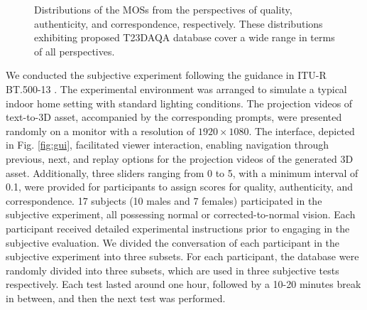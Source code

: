 \begin{figure*}[t]
    \centering
    \caption{Distributions of the MOSs from the perspectives of quality, authenticity, and correspondence, respectively. These distributions exhibiting proposed T23DAQA database cover a wide range in terms of all perspectives. }
    \label{fig:mos}
    \vspace{-0.5cm}
\end{figure*}

We conducted the subjective experiment following the guidance in ITU-R BT.500-13 \cite{other:itu}. The experimental environment was arranged to simulate a typical indoor home setting with standard lighting conditions. The projection videos of text-to-3D asset, accompanied by the corresponding prompts, were presented randomly on a monitor with a resolution of $1920 \times 1080$. The interface, depicted in Fig. \ref{fig:gui}, facilitated viewer interaction, enabling navigation through previous, next, and replay options for the projection videos of the generated 3D asset. Additionally, three sliders ranging from 0 to 5, with a minimum interval of 0.1, were provided for participants to assign scores for quality, authenticity, and correspondence. 17 subjects (10 males and 7 females) participated in the subjective experiment, all possessing normal or corrected-to-normal vision. Each participant received detailed experimental instructions prior to engaging in the subjective evaluation. We divided the conversation of each participant in the subjective experiment into three subsets. For each participant, the database were randomly divided into three subsets, which are used in three subjective tests respectively. Each test lasted around one hour, followed by a 10-20 minutes break in between, and then the next test was performed.
\vspace{-15pt}
